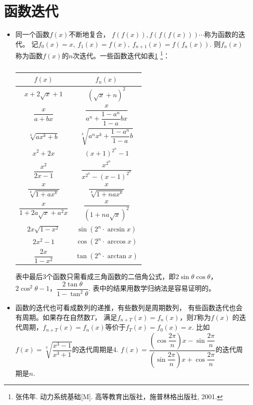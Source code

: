\section{函数迭代}
\begin{itemize}[leftmargin=\inteval{\myitemleftmargin}pt,itemsep=
   \inteval{\myitemitempsep}pt,topsep=\inteval{\myitemtopsep}pt]
\item 同一个函数$ f(x) $不断地复合，
$ f(f(x)),f(f(f(x))) \cdots $称为函数的迭代。
记$ f_0(x)=x,\ f_1(x)=f(x),\ f_{n+1}(x)=f(f_n(x)) $. 
则$ f_n(x) $称为函数$ f(x) $的$ n $次迭代。一些函数迭代如表\ref{函数迭代列表}
\footnote{张伟年. 动力系统基础[M]. 高等教育出版社，施普林格出版社, 2001.}：
\begin{table}[h] 
\centering
\renewcommand\arraystretch{1.5}  
\caption{}   
\begin{tabular}{|c|c|} 
    \hline
    $ f(x) $ & $ f_n(x) $ \\
    \hline
    $ x+2\sqrt{x}+1 $ & $ (\sqrt{x}+n)^2 $ \\
    \hline
    $ \dfrac{x}{a+bx} $ & $ \dfrac{x}{a^n+\dfrac{1-a^n}{1-a}bx} $ \\
    \hline
    $ \sqrt[k]{ax^k+b} $ & $ \sqrt[k]{a^nx^k+\dfrac{1-a^n}{1-a}b} $ \\
    \hline
    $ x^2+2x $ & $ (x+1)^{2^n}-1 $ \\
    \hline
    $ \dfrac{x^2}{2x-1} $ & $\dfrac{x^{2^n}}{x^{2^n}-(x-1)^{2^n}}$ \\
    \hline
    $ \dfrac{x}{\sqrt[k]{1+ax^k}} $ & $ \dfrac{x}{\sqrt[k]{1+nax^k}}  $ \\
    \hline
    $ \dfrac{x}{1+2a\sqrt{x}+a^2x} $ & $ \dfrac{x}{(1+na\sqrt{x})^2} $ \\
    \hline
    $ 2x\sqrt{1-x^2} $ & $ \sin(2^n\cdot \arcsin x) $ \\
    \hline
    $ 2x^2-1 $ & $ \cos(2^n\cdot \arccos x) $ \\
    \hline
    $ \dfrac{2x}{1-x^2} $ & $ \tan(2^n\cdot \arctan x) $ \\
    \hline
\end{tabular}
\label{函数迭代列表}
\end{table} 

表中最后3个函数只需看成三角函数的二倍角公式，即$ 2\sin \theta\cos \theta $，
$ 2\cos^2 \theta-1 $，$ \dfrac{2\tan \theta}{1-\tan^2 \theta} $. 
表中的结果用数学归纳法是容易证明的。

\item 函数的迭代也可看成数列的递推，有些数列是周期数列，
有些函数迭代也会有周期。如果存在自然数$ T $，
满足$ f_{n+T}(x)=f_n(x) $，则$ T $称为$ f(x) $
的迭代周期，$ f_{n+T}(x)=f_n(x) $等价于$ f_T(x)=f_0(x)=x $. 
比如$ f(x)=\sqrt[3]{\dfrac{x^3-1}{x^3+1}} $的迭代周期是4.
$ f(x)=\dfrac{(\cos \dfrac{2\pi}{n})x-\sin \dfrac{2\pi}{n}}
{(\sin\dfrac{2\pi}{n})x+\cos \dfrac{2\pi}{n}} $的迭代周期是$ n $. 


\end{itemize}

